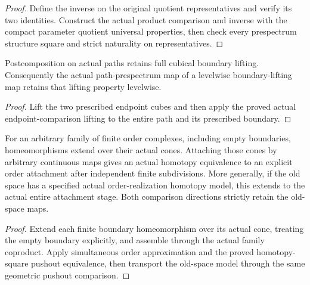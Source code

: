 \begin{proof}
  Define the inverse on the original quotient representatives and verify its two identities. Construct the actual product comparison and inverse with the compact parameter quotient universal properties, then check every prespectrum structure square and strict naturality on representatives.
  \leanok
\end{proof}

\begin{proposition}
  \label{prop:actual-path-postcomposition-lifting}
  \leanok
  Postcomposition on actual paths retains full cubical boundary lifting. Consequently the actual path-prespectrum map of a levelwise boundary-lifting map retains that lifting property levelwise.
\end{proposition}
\begin{proof}
  Lift the two prescribed endpoint cubes and then apply the proved actual endpoint-comparison lifting to the entire path and its prescribed boundary.
  \leanok
\end{proof}

\begin{proposition}
  \label{prop:actual-order-family-cone-attachment}
  \leanok
  For an arbitrary family of finite order complexes, including empty boundaries, homeomorphisms extend over their actual cones. Attaching those cones by arbitrary continuous maps gives an actual homotopy equivalence to an explicit order attachment after independent finite subdivisions. More generally, if the old space has a specified actual order-realization homotopy model, this extends to the actual entire attachment stage. Both comparison directions strictly retain the old-space maps.
\end{proposition}
\begin{proof}
  Extend each finite boundary homeomorphism over its actual cone, treating the empty boundary explicitly, and assemble through the actual family coproduct. Apply simultaneous order approximation and the proved homotopy-square pushout equivalence, then transport the old-space model through the same geometric pushout comparison.
  \leanok
\end{proof}

